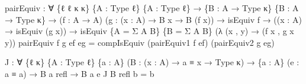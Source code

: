 \documentclass[
  11pt,
  oneside,
  article]{memoir}
\newenvironment{Shaded}{}{}
\newcommand{\NormalTok}[1]{#1}
\newcommand{\OtherTok}[1]{\textcolor[rgb]{0.00,0.44,0.13}{#1}}
\theoremstyle{definition}
\theoremstyle{plain}
\newcommand{\0}{\textsf{0}}
\newcommand{\1}{\tn{\textsf{1}}}
\begin{document}
\begin{Shaded}
\begin{Highlighting}[]
\NormalTok{pairEquiv }\OtherTok{:} \OtherTok{∀} \OtherTok{\{}\NormalTok{ℓ ℓ\textquotesingle{} κ κ\textquotesingle{}}\OtherTok{\}} \OtherTok{\{}\NormalTok{A }\OtherTok{:}\NormalTok{ Type ℓ}\OtherTok{\}} \OtherTok{\{}\NormalTok{A\textquotesingle{} }\OtherTok{:}\NormalTok{ Type ℓ\textquotesingle{}}\OtherTok{\}}
            \OtherTok{→} \OtherTok{\{}\NormalTok{B }\OtherTok{:}\NormalTok{ A }\OtherTok{→}\NormalTok{ Type κ}\OtherTok{\}} \OtherTok{\{}\NormalTok{B\textquotesingle{} }\OtherTok{:}\NormalTok{ A\textquotesingle{} }\OtherTok{→}\NormalTok{ Type κ\textquotesingle{}}\OtherTok{\}}
            \OtherTok{→} \OtherTok{(}\NormalTok{f }\OtherTok{:}\NormalTok{ A }\OtherTok{→}\NormalTok{ A\textquotesingle{}}\OtherTok{)} \OtherTok{(}\NormalTok{g }\OtherTok{:} \OtherTok{(}\NormalTok{x }\OtherTok{:}\NormalTok{ A}\OtherTok{)} \OtherTok{→}\NormalTok{ B x }\OtherTok{→}\NormalTok{ B\textquotesingle{} }\OtherTok{(}\NormalTok{f x}\OtherTok{))}
            \OtherTok{→}\NormalTok{ isEquiv f }\OtherTok{→} \OtherTok{((}\NormalTok{x }\OtherTok{:}\NormalTok{ A}\OtherTok{)} \OtherTok{→}\NormalTok{ isEquiv }\OtherTok{(}\NormalTok{g x}\OtherTok{))}
            \OtherTok{→}\NormalTok{ isEquiv }\OtherTok{\{}\NormalTok{A }\OtherTok{=}\NormalTok{ Σ A B}\OtherTok{\}} \OtherTok{\{}\NormalTok{B }\OtherTok{=}\NormalTok{ Σ A\textquotesingle{} B\textquotesingle{}}\OtherTok{\}}
                      \OtherTok{(λ} \OtherTok{(}\NormalTok{x , y}\OtherTok{)} \OtherTok{→} \OtherTok{(}\NormalTok{f x , g x y}\OtherTok{))}
\NormalTok{pairEquiv f g ef eg }\OtherTok{=} 
\NormalTok{    compIsEquiv }\OtherTok{(}\NormalTok{pairEquiv1 f ef}\OtherTok{)} 
                \OtherTok{(}\NormalTok{pairEquiv2 g eg}\OtherTok{)}

\NormalTok{J }\OtherTok{:} \OtherTok{∀} \OtherTok{\{}\NormalTok{ℓ κ}\OtherTok{\}} \OtherTok{\{}\NormalTok{A }\OtherTok{:}\NormalTok{ Type ℓ}\OtherTok{\}} \OtherTok{\{}\NormalTok{a }\OtherTok{:}\NormalTok{ A}\OtherTok{\}} \OtherTok{(}\NormalTok{B }\OtherTok{:} \OtherTok{(}\NormalTok{x }\OtherTok{:}\NormalTok{ A}\OtherTok{)} \OtherTok{→}\NormalTok{ a ≡ x }\OtherTok{→}\NormalTok{ Type κ}\OtherTok{)}
    \OtherTok{→} \OtherTok{\{}\NormalTok{a\textquotesingle{} }\OtherTok{:}\NormalTok{ A}\OtherTok{\}} \OtherTok{(}\NormalTok{e }\OtherTok{:}\NormalTok{ a ≡ a\textquotesingle{}}\OtherTok{)} \OtherTok{→}\NormalTok{ B a refl }\OtherTok{→}\NormalTok{ B a\textquotesingle{} e}
\NormalTok{J B refl b }\OtherTok{=}\NormalTok{ b}


\end{Highlighting}
\end{Shaded}
\end{document}
